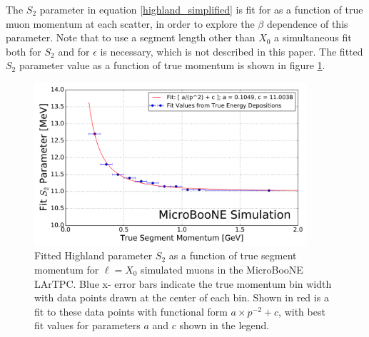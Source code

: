 \documentclass[a4paper,11pt]{article}
\begin{document}
The $S_2$ parameter in equation \ref{highland_simplified} is fit for as a function of true muon momentum at each scatter, in order to explore the $\beta$ dependence of this parameter. Note that to use a segment length other than $X_0$ a simultaneous fit both for $S_2$ and for $\epsilon$ is necessary, which is not described in this paper. The fitted $S_2$ parameter value as a function of true momentum is shown in figure \ref{retune_highland_fig1}.



\begin{figure}[ht!]
\begin{center}
\includegraphics[width=0.9\textwidth]{Figures/highland_constant_optimization_momentumdependent.png}
\end{center}
\caption{Fitted Highland parameter $S_2$ as a function of true segment momentum for ${\ell} = X_0$ simulated muons in the MicroBooNE LArTPC. Blue x- error bars indicate the true momentum bin width with data points drawn at the center of each bin. Shown in red is a fit to these data points with functional form $a\times p^{-2} + c$, with best fit values for parameters $a$ and $c$ shown in the legend.}
\label{retune_highland_fig1}
\end{figure}
\end{document}
